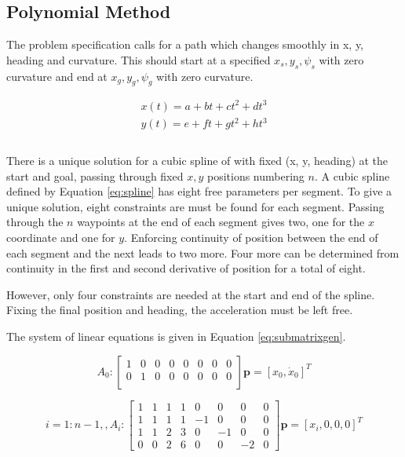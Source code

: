 \subsection{Polynomial Method}
The problem specification calls for a path which changes smoothly in x, y, heading and curvature. This should start at a specified $x_s, y_s, \psi_s$ with zero curvature and end at $x_g, y_g, \psi_g$ with zero curvature.

\begin{equation}
\begin{array}{c}
x(t) = a + bt + ct^2 + dt^3 \\
y(t) = e + ft + gt^2 + ht^3 \\
\end{array}
\label{eq:spline}
\end{equation}\\

There is a unique solution for a cubic spline of with fixed (x, y, heading) at the start and goal, passing through fixed $x, y$ positions numbering $n$. A cubic spline defined by Equation \ref{eq:spline} has eight free parameters per segment. To give a unique solution, eight constraints are must be found for each segment. Passing through the $n$ waypoints at the end of each segment gives two, one for the $x$ coordinate and one for $y$. Enforcing continuity of position between the end of each segment and the next leads to two more. Four more can be determined from continuity in the first and second derivative of position for a total of eight. 

However, only four constraints are needed at the start and end of the spline. Fixing the final position and heading, the acceleration must be left free. 

The system of linear equations is given in Equation \ref{eq:submatrixgen}. 

\begin{equation}
A_0 : \left[ \begin{matrix}
1 & 0 & 0 & 0 & 0 & 0 & 0 & 0 \\
0 & 1 & 0 & 0 & 0 & 0 & 0 & 0 \\
\end{matrix} \right]\bm{p} = [x_0, \dot{x}_0]^T 
\label{eq:submatrix1}
\end{equation}

\begin{equation}
i = 1:n-1, ,  
A_i : \left[\begin{matrix}
1 & 1 & 1 & 1 & 0 & 0 & 0 & 0 \\
1 & 1 & 1 & 1 & -1 & 0 & 0 & 0 \\
1 & 1 & 2 & 3 & 0 & -1 & 0 & 0 \\
0 & 0 & 2 & 6 & 0 & 0 & -2 & 0
\end{matrix}\right] \bm{p} = [x_{i}, 0, 0, 0]^T
\label{eq:submatrixgen}
\end{equation}

